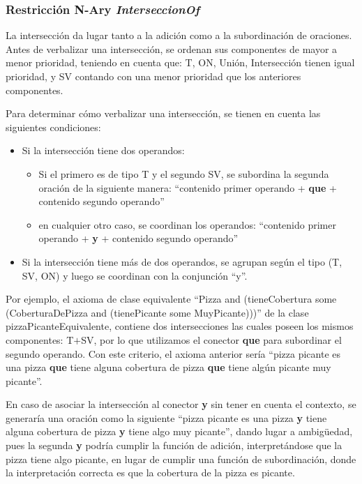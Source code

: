 \subsubsection{Restricción N-Ary \emph{InterseccionOf}}
La intersección da lugar tanto a la adición como a la subordinación de oraciones. Antes de verbalizar una intersección, se ordenan sus componentes de mayor a menor prioridad, teniendo en cuenta que: T, ON, Unión, Intersección tienen  igual prioridad, y SV contando con una menor prioridad que los anteriores componentes. 

Para determinar cómo verbalizar una intersección, se tienen en cuenta las siguientes condiciones:
\begin{itemize}
    \item Si la intersección tiene dos operandos:
        \begin{itemize}
            \item Si el primero es de tipo T  y el segundo SV, se subordina la segunda oración de la siguiente manera:
            ``contenido primer operando + \textbf{que} + contenido segundo operando''
            \item en cualquier otro caso, se coordinan los operandos:
            ``contenido primer operando + \textbf{y} + contenido segundo operando''
        \end{itemize}
        \item Si la intersección tiene más de dos operandos, se agrupan según el tipo  (T, SV, ON) y luego se coordinan con la conjunción ``y''.
\end{itemize}

Por ejemplo, el axioma de clase equivalente ``Pizza and (tieneCobertura some (CoberturaDePizza and (tienePicante some MuyPicante)))'' de la clase pizzaPicanteEquivalente, contiene dos intersecciones las cuales poseen los mismos componentes: T$+$SV, por lo que utilizamos el conector \textbf{que} para subordinar el segundo operando. Con este criterio, el axioma anterior sería ``pizza picante es una pizza \textbf{que} tiene alguna cobertura de pizza {\textbf{que}} tiene algún picante muy picante''.

En caso de asociar la intersección al conector \textbf{y} sin tener en cuenta el contexto, se generaría una oración como la siguiente ``pizza picante es una pizza \textbf{y} tiene alguna cobertura de pizza \textbf{y} tiene algo muy picante'', dando lugar a ambigüedad, pues la segunda \textbf{y} podría cumplir la función de adición, interpretándose que la pizza tiene algo picante, en lugar de cumplir una función de subordinación, donde la interpretación correcta es que la cobertura de la pizza es picante. 

